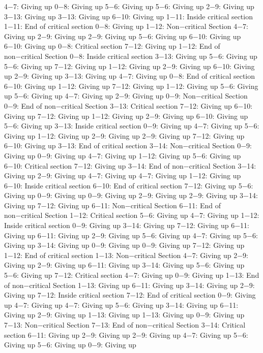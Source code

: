 4−7: Giving up
0−8: Giving up
5−6: Giving up
5−6: Giving up
2−9: Giving up
3−13: Giving up
3−13: Giving up
6−10: Giving up
1−11: Inside critical section
1−11: End of critical section
0−8: Giving up
1−12: Non−critical Section
4−7: Giving up
2−9: Giving up
2−9: Giving up
5−6: Giving up
6−10: Giving up
6−10: Giving up
0−8: Critical section
7−12: Giving up
1−12: End of non−critical Section
0−8: Inside critical section
3−13: Giving up
5−6: Giving up
5−6: Giving up
7−12: Giving up
1−12: Giving up
2−9: Giving up
6−10: Giving up
2−9: Giving up
3−13: Giving up
4−7: Giving up
0−8: End of critical section
6−10: Giving up
1−12: Giving up
7−12: Giving up
1−12: Giving up
5−6: Giving up
5−6: Giving up
4−7: Giving up
2−9: Giving up
0−9: Non−critical Section
0−9: End of non−critical Section
3−13: Critical section
7−12: Giving up
6−10: Giving up
7−12: Giving up
1−12: Giving up
2−9: Giving up
6−10: Giving up
5−6: Giving up
3−13: Inside critical section
0−9: Giving up
4−7: Giving up
5−6: Giving up
1−12: Giving up
2−9: Giving up
2−9: Giving up
7−12: Giving up
6−10: Giving up
3−13: End of critical section
3−14: Non−critical Section
0−9: Giving up
0−9: Giving up
4−7: Giving up
1−12: Giving up
5−6: Giving up
6−10: Critical section
7−12: Giving up
3−14: End of non−critical Section
3−14: Giving up
2−9: Giving up
4−7: Giving up
4−7: Giving up
1−12: Giving up
6−10: Inside critical section
6−10: End of critical section
7−12: Giving up
5−6: Giving up
0−9: Giving up
0−9: Giving up
2−9: Giving up
2−9: Giving up
3−14: Giving up
7−12: Giving up
6−11: Non−critical Section
6−11: End of non−critical Section
1−12: Critical section
5−6: Giving up
4−7: Giving up
1−12: Inside critical section
0−9: Giving up
3−14: Giving up
7−12: Giving up
6−11: Giving up
6−11: Giving up
2−9: Giving up
5−6: Giving up
4−7: Giving up
5−6: Giving up
3−14: Giving up
0−9: Giving up
0−9: Giving up
7−12: Giving up
1−12: End of critical section
1−13: Non−critical Section
4−7: Giving up
2−9: Giving up
2−9: Giving up
6−11: Giving up
3−14: Giving up
5−6: Giving up
5−6: Giving up
7−12: Critical section
4−7: Giving up
0−9: Giving up
1−13: End of non−critical Section
1−13: Giving up
6−11: Giving up
3−14: Giving up
2−9: Giving up
7−12: Inside critical section
7−12: End of critical section
0−9: Giving up
4−7: Giving up
4−7: Giving up
5−6: Giving up
3−14: Giving up
6−11: Giving up
2−9: Giving up
1−13: Giving up
1−13: Giving up
0−9: Giving up
7−13: Non−critical Section
7−13: End of non−critical Section
3−14: Critical section
6−11: Giving up
2−9: Giving up
2−9: Giving up
4−7: Giving up
5−6: Giving up
5−6: Giving up
0−9: Giving up
